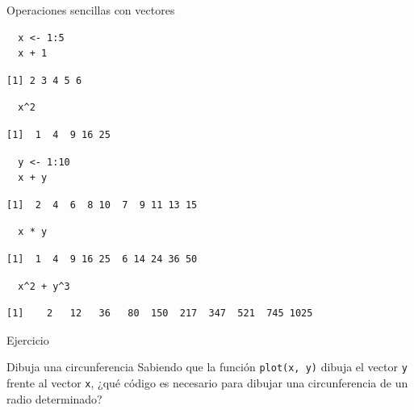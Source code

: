 \documentclass[xcolor={usenames,svgnames,dvipsnames}]{beamer}
\begin{document}
\begin{frame}[fragile,label={sec:org134a348}]{Operaciones sencillas con vectores}
 \lstset{language=r,label= ,caption= ,captionpos=b,numbers=none}
\begin{lstlisting}
  x <- 1:5
  x + 1
\end{lstlisting}

\begin{verbatim}
[1] 2 3 4 5 6
\end{verbatim}

\lstset{language=r,label= ,caption= ,captionpos=b,numbers=none}
\begin{lstlisting}
  x^2
\end{lstlisting}

\begin{verbatim}
[1]  1  4  9 16 25
\end{verbatim}

\lstset{language=r,label= ,caption= ,captionpos=b,numbers=none}
\begin{lstlisting}
  y <- 1:10
  x + y
\end{lstlisting}

\begin{verbatim}
[1]  2  4  6  8 10  7  9 11 13 15
\end{verbatim}

\lstset{language=r,label= ,caption= ,captionpos=b,numbers=none}
\begin{lstlisting}
  x * y
\end{lstlisting}

\begin{verbatim}
[1]  1  4  9 16 25  6 14 24 36 50
\end{verbatim}

\lstset{language=r,label= ,caption= ,captionpos=b,numbers=none}
\begin{lstlisting}
  x^2 + y^3
\end{lstlisting}

\begin{verbatim}
[1]    2   12   36   80  150  217  347  521  745 1025
\end{verbatim}
\end{frame}




\begin{frame}[fragile,label={sec:orgb06fa53}]{Ejercicio}
 \begin{block}{Dibuja una circunferencia}
Sabiendo que la función \texttt{plot(x, y)} dibuja el vector \texttt{y} frente al
vector \texttt{x}, ¿qué código es necesario para dibujar una circunferencia
de un radio determinado?
\end{block}
\end{frame}
\end{document}
